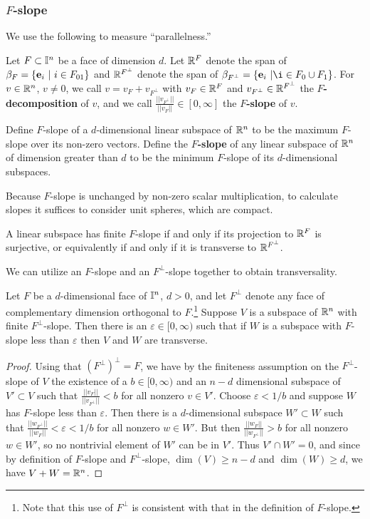 \subsubsection{$F$-slope}
We use the following to measure ``parallelness.''

\begin{definition}
	Let $F \subset \mathbb{I}^n$ be a face of dimension $d$. Let $\mathbb{R}^F$ denote the span of
	$\beta_F = \{\mathbf{e}_i\ |\ i \in F_{01}\}$ and $\mathbb{R}^{F^\perp}$ denote the span of $\beta_{F^\perp} = \{\e_i\ |\i \in F_0 \cup F_1\}$.
	For $v \in \mathbb{R}^n$, $v \neq 0$, we call $v = v_F + v_{F^\perp}$ with $v_F \in \mathbb{R}^F$ and $v_{F^\perp} \in \mathbb{R}^{F^\perp}$ the {\bf $F$-decomposition} of $v$, and we call $\frac{|| v_{F^\perp}||}{||v_{F}||} \in [0,\infty]$ the {\bf $F$-slope} of $v$.

	Define $F$-slope of a $d$-dimensional linear subspace of $\mathbb{R}^n$ to be the maximum $F$-slope over its non-zero vectors.
	Define the {\bf $F$-slope} of any linear subspace of $\mathbb{R}^n$ of dimension greater than $d$ to be the minimum $F$-slope of its $d$-dimensional subspaces.
\end{definition}

Because $F$-slope is unchanged by non-zero scalar multiplication, to calculate slopes it suffices to consider unit spheres,
which are compact.

A linear subspace has finite $F$-slope if and only if its projection to $\mathbb{R}^F$ is surjective, or equivalently if and only if it is transverse to $\mathbb{R}^{F^\perp}$.

We can utilize an $F$-slope and an $F^\perp$-slope together to obtain transversality.

\begin{lemma}\label{L:complementaryslopes}
	Let $F$ be a $d$-dimensional face of $\mathbb{I}^n$, $d>0$, and let $F^\perp$ denote any face of complementary dimension orthogonal to $F$.\footnote{Note that this use of $F^\perp$ is consistent with that in the definition of $F$-slope.}
	Suppose $V$ is a subspace of $\mathbb{R}^n$ with finite $F^\perp$-slope.
	Then there is an $\varepsilon \in [0,\infty)$ such that if $W$ is a subspace with $F$-slope less than $\varepsilon$ then $V$ and $W$ are transverse.
\end{lemma}
\begin{proof}
	Using that $(F^\perp)^\perp = F$, we have by the finiteness assumption on the $F^\perp$-slope of $V$
	the existence of a $b \in [0,\infty)$ and an $n-d$ dimensional subspace of $V' \subset V$ such that $\frac{||v_{F}||}{||v_{F^\perp}||} <b$ for all nonzero $v \in V'$.
	Choose $\varepsilon < 1/b$ and suppose $W$ has $F$-slope less than $\varepsilon$.
	Then there is a $d$-dimensional subspace $W' \subset W$ such that $\frac{|| w_{F^\perp}||}{||w_{F}||} < \varepsilon < 1/b$ for all nonzero $w \in W'$.
	But then $\frac{|| w_{F}||}{||w_{F^\perp}||} > b$ for all nonzero $w \in W'$, so no nontrivial element of $W'$ can be in $V'$.
	Thus $V' \cap W' = 0$, and since by definition of $F$-slope and $F^\perp$-slope,
	$\dim(V) \geq n-d$ and $\dim(W) \geq d$, we have $V + W = \mathbb{R}^n$.
\end{proof}

